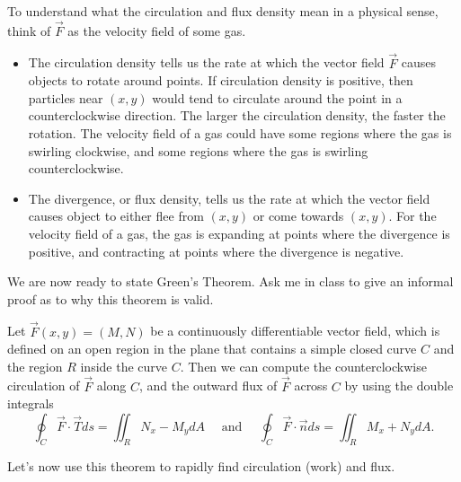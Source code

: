 To understand what the circulation and flux density mean in a physical sense, think of $\vec F$ as the velocity field of some gas.  
\begin{itemize}
 \item The circulation density tells us the rate at which the vector field $\vec F$ causes objects to rotate around points.  If circulation density is positive, then particles near $(x,y)$ would tend to circulate around the point in a counterclockwise direction. The larger the circulation density, the faster the rotation. The velocity field of a gas could have some regions where the gas is swirling clockwise, and some regions where the gas is swirling counterclockwise.
 \item The divergence, or flux density, tells us the rate at which the vector field causes object to either flee from $(x,y)$ or come towards $(x,y)$. For the velocity field of a gas, the gas is expanding at points where the divergence is positive, and contracting at points where the divergence is negative. 
\end{itemize}


We are now ready to state Green's Theorem.  Ask me in class to give an informal proof as to why this theorem is valid.
\begin{theorem}
 Let $\vec F(x,y)=(M,N)$ be a continuously differentiable vector field, which is defined on an open region in the plane that contains a simple closed curve $C$ and the region $R$ inside the curve $C$.  Then we can compute the counterclockwise circulation of $\vec F$ along $C$, and the outward flux of $\vec F$ across $C$ by using the double integrals
$$ \oint_{C} \vec F \cdot \vec T ds=\iint_R N_x-M_y dA 
\quad \text{ and } \quad 
\oint_{C} \vec F \cdot \vec n ds=\iint_R M_x+N_y dA.$$
\end{theorem}

Let's now use this theorem to rapidly find circulation (work) and flux.


